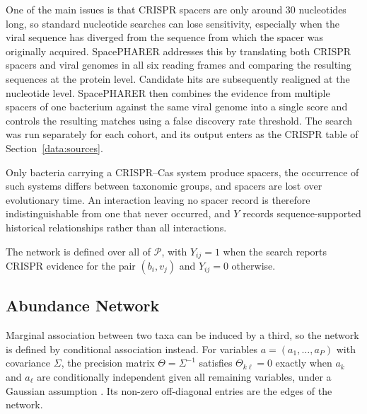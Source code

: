 One of the main issues is that CRISPR spacers are only around 30 nucleotides long, so standard nucleotide 
searches can lose sensitivity, especially when the viral sequence has diverged from the sequence from which the 
spacer was originally acquired. SpacePHARER \citep{zhang2021spacepharer} addresses this by translating both 
CRISPR spacers and viral genomes in all six reading frames and comparing the resulting sequences at the protein 
level. Candidate hits are subsequently realigned at the nucleotide level. SpacePHARER then combines the evidence 
from multiple spacers of one bacterium against the same viral genome into a single score and controls the 
resulting matches using a false discovery rate threshold. The search was run separately for each cohort, and 
its output enters as the CRISPR table of Section~\ref{data:sources}.

Only bacteria carrying a CRISPR--Cas system produce spacers, the occurrence of such systems differs between
taxonomic groups, and spacers are lost over evolutionary time. An interaction leaving no spacer record is
therefore indistinguishable from one that never occurred, and \(Y\) records sequence-supported historical
relationships rather than all interactions.


The network is defined over all of \(\mathcal{P}\), with \(Y_{ij}=1\) when the search reports CRISPR
evidence for the pair \((b_i,v_j)\) and \(Y_{ij}=0\) otherwise.

\subsection{Abundance Network}

Marginal association between two taxa can be induced by a third, so the network is defined by conditional
association instead. For variables \(a=(a_1,\ldots,a_P)\) with covariance \(\Sigma\), the precision matrix
\(\Theta=\Sigma^{-1}\) satisfies \(\Theta_{k\ell}=0\) exactly when \(a_k\) and \(a_\ell\) are
conditionally independent given all remaining variables, under a Gaussian assumption \citep{Bishop2006}.
Its non-zero off-diagonal entries are the edges of the network.

